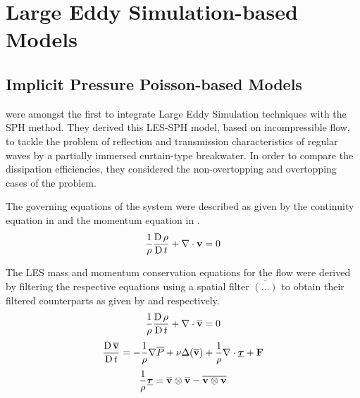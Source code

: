 \section{Large Eddy Simulation-based Models}
\label{sec:les-based-model}
\subsection{Implicit Pressure Poisson-based Models}
\label{sec:Implicit-Pressure-Poisson-based-Models}
\cite{Gotoh2004} were amongst the first to integrate Large Eddy Simulation techniques with the SPH method. They derived this LES-SPH model, based on incompressible flow, to tackle the problem of reflection and transmission characteristics of regular waves by a partially immersed curtain-type breakwater. In order to compare the dissipation efficiencies, they considered the non-overtopping and overtopping cases of the problem.

The governing equations of the system were described as given by the continuity equation in  and the momentum equation in .
\begin{equation}
    \frac{1}{\rho} \frac{\operatorname{D} \rho}{\operatorname{D} t} + \nabla \cdot \mathbf{v} = 0
    \label{eq:Gotoh2004-continuity-governing}
\end{equation}

The LES mass and momentum conservation equations for the flow were derived by filtering the respective equations using a spatial filter $\overline{(...)}$ to obtain their filtered counterparts as given by  and  respectively.
\begin{equation}
    \frac{1}{\rho} \frac{\operatorname{D} \rho}{\operatorname{D} t} + \nabla \cdot \mathbf{\overline{v}} = 0
    \label{eq:Gotoh2004-continuity-filtered}
\end{equation}
\begin{equation}
    \frac{\operatorname{D} \mathbf{\overline{v}}}{\operatorname{D} t} = -\frac{1}{\rho}\nabla \overline{P} + \nu \Delta ( \mathbf{\overline{v}} ) + \frac{1}{\rho}\nabla\cdot\underline{\bm{\tau}} + \mathbf{F}
    \label{eq:Gotoh2004-mom-filtered}
\end{equation}
\begin{equation}
    \frac{1}{\rho} \underline{\bm{\tau}} = \mathbf{\overline{v}} \otimes \mathbf{\overline{v}} - \overline{\mathbf{v} \otimes \mathbf{v}}
    \label{eq:Gotoh2004-stress-tensor}
\end{equation}

